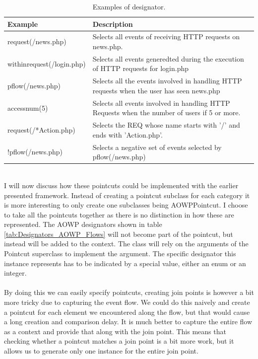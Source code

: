 \documentclass[a4paper]{report}
\begin{document}
\begin{table}[h!]
\centering
\begin{tabular}{l|p{7cm}}
\hline
Example & Description\\
\hline
\hline
request(/news.php) & Selects all events of receiving HTTP requests on news.php.\\
\hline
withinrequest(/login.php) & Selects all events generedted during the execution of HTTP requests for login.php\\
\hline
pflow(/news.php) & Selects all the events involved in handling HTTP requests when the user has seen news.php\\
\hline
accessnum(5) & Selects all events involved in handling HTTP Requests when the number of users if 5 or more.\\
\hline
request(/*Action.php) & Selects the REQ whose name starts with '/' and ends with 'Action.php'.\\
\hline
!pflow(/news.php) & Selects a negative set of events selected by pflow(/news.php)\\
\hline
\end{tabular}
\caption{Examples of designator.}
\label{tab:Designators_AOWP_Pointcut}
\end{table}
\\
I will now discuss how these pointcuts could be implemented with the earlier presented framework. Instead of creating a pointcut subclass for each category it is more interesting to only create one subclasses being AOWPPointcut. I choose to take all the pointcuts together as there is no distinction in how these are represented. The AOWP designators shown in table \ref{tab:Designators_AOWP_Flows} will not become part of the pointcut, but instead will be added to the context. The class will rely on the arguments of the Pointcut superclass to implement the argument. The specific designator this instance represents has to be indicated by a special value, either an enum or an integer. \\
\\
By doing this we can easily specify pointcuts, creating join points is however a bit more tricky due to capturing the event flow. We could do this naively and create a pointcut for each element we encountered along the flow, but that would cause a long creation and comparison delay. It is much better to capture the entire flow as a context and provide that along with the join point. This means that checking whether a pointcut matches a join point is a bit more work, but it allows us to generate only one instance for the entire join point.\\
\end{document}
